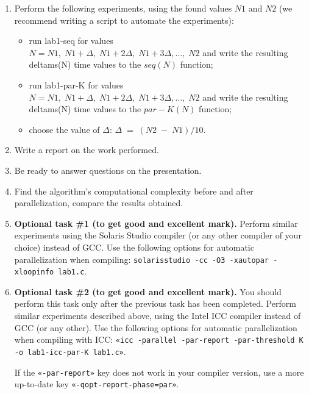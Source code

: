 {\begin{enumerate}
		\item Perform the following experiments, using the found values $ N1 $ and $ N2 $ (we recommend writing a script to automate the experiments):
			\begin{itemize}
				\item run lab1-seq for values \\$N={N1,\;N1+\Delta,\;N1+2\Delta,\;N1+3\Delta,…,\;N2}$ and write the resulting  delta\textunderscore ms(N) time values to the $seq(N)$ function;
				\item run lab1-par-K for values \\$N={N1,\;N1+\Delta,\;N1+2\Delta,\;N1+3\Delta,…,\;N2}$ and write the resulting delta\textunderscore ms(N) time values to the $par-K(N)$ function;
				\item choose the value of $\Delta$: $\Delta\;=\;(N2\;-\;N1)/10$.
			\end{itemize}
		\item Write a report on the work performed.
		\item Be ready to answer questions on the presentation.
		\item Find the algorithm's computational complexity before and after parallelization, compare the results obtained.
		\sloppy
		\item\textbf{Optional task \#1 (to get good and excellent mark).} Perform similar experiments using the Solaris Studio compiler (or any other compiler of your choice) instead of GCC. Use the following options for automatic parallelization when compiling: {\small \texttt{solarisstudio -cc -O3 -xautopar -xloopinfo lab1.c}}.
 		\item\textbf{Optional task \#2 (to get good and excellent mark).} You should perform this task only after the previous task has been completed. Perform similar experiments described above, using the Intel ICC compiler instead of GCC (or any other). Use the following options for automatic parallelization when compiling with ICC: \verb+«icc -parallel -par-report -par-threshold K -o lab1-icc-par-K lab1.c»+.
			\par If the \verb+«-par-report»+ key does not work in your compiler version, use a more up-to-date key \verb+«-qopt-report-phase=par»+.
	\end{enumerate}
	
}